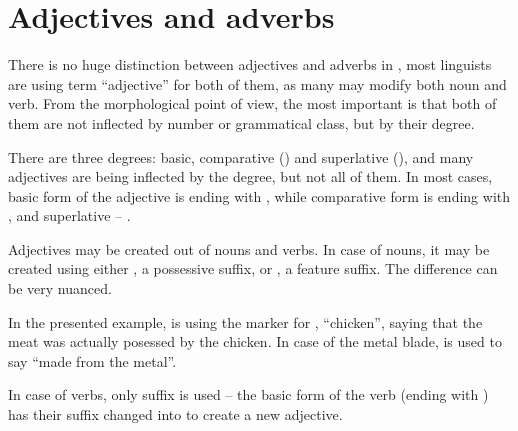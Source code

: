 


\section{Adjectives and adverbs}

There is no huge distinction between adjectives and adverbs in \andro, most
linguists are using term ``adjective'' for both of them, as many may modify both
noun and verb. From the morphological point of view, the most important is that
both of them are not inflected by number or grammatical class, but by their
degree.

There are three degrees: basic, comparative (\Comp{}) and superlative (\Supl{}),
and many adjectives are being inflected by the degree, but not all of them. In
most cases, basic form of the adjective is ending with , while
comparative form is ending with , and superlative -- .

Adjectives may be created out of nouns and verbs. In case of nouns, it may be
created using either , a possessive suffix, or , a feature
suffix. The difference can be very nuanced.



In the presented example,  is using the  marker for
, ``chicken'', saying that the meat was actually posessed by the
chicken. In case of the metal blade,  is used to say ``made from
the metal''.

In case of verbs, only  suffix is used -- the basic form of the verb
(ending with ) has their suffix changed into  to create a new
adjective.



